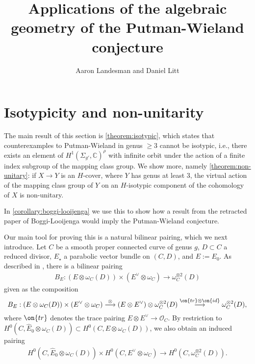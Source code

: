 \documentclass[12 pt]{amsart}
\title[Applications around the Putman-Wieland conjecture]{Applications of the algebraic geometry of the Putman-Wieland conjecture}
\author{Aaron Landesman and Daniel Litt}
\theoremstyle{plain}
\theoremstyle{definition}
\theoremstyle{remark}
\numberwithin{equation}{section}
\begin{document}
\section{Isotypicity and non-unitarity}\label{section:bilinear-pairing}
The main result of this section is \autoref{theorem:isotypic}, which states that
counterexamples to Putman-Wieland in genus $\geq 3$ cannot be isotypic, i.e.,
there exists an element of 
$H^1(\Sigma_{g'}, \mathbb C)^\rho$ with infinite orbit under the action of a finite
index subgroup of the mapping class group. We show more, namely \autoref{theorem:non-unitary}: if $X\to Y$ is an $H$-cover, where $Y$ has genus at least $3$, the virtual action of the mapping class group of $Y$ on an $H$-isotypic component of the cohomology of $X$ is non-unitary.

In \autoref{corollary:boggi-looijenga} we use this to show how a
 result from the retracted paper of Boggi-Looijenga \cite{boggiL:curves-with-prescribed-symmetry} would imply the Putman-Wieland conjecture.

Our main tool for proving this is a natural bilinear pairing, which we
next introduce.
Let $C$ be a smooth proper connected curve of genus $g$, $D\subset C$ a reduced
divisor, $E_\star$
a parabolic vector bundle on $(C,D)$, and $E := E_0$. 
As described in \cite[(4.5)]{landesmanL:canonical-representations}, there is a bilinear pairing
\begin{align}
	\label{equation:bilinear-pairing}
	B_E:
(E \otimes \omega_C(D))\times (E^\vee\otimes \omega_C) \to
\omega_C^{\otimes 2}(D)
\end{align}
given as the composition $$B_E: (E \otimes \omega_C(D))\times (E^\vee\otimes \omega_C)\overset{\otimes}{\longrightarrow} (E\otimes E^\vee)\otimes \omega_C^{\otimes 2}(D)\overset{\on{tr}\otimes \on{id}}{\longrightarrow} \omega_C^{\otimes 2}(D),$$
where $\on{tr}$ denotes the trace pairing ${E}\otimes {E}^\vee\to
\mathscr{O}_C.$ 
By restriction to $H^0(C, \widehat{E}_0 \otimes \omega_C(D)) \subset H^0(C, E \otimes
\omega_C(D))$, we also obtain an induced pairing
\begin{align*}
	H^0(C, \widehat{E}_0 \otimes \omega_C(D)) \times H^0(C, E^\vee \otimes
	\omega_C) \to H^0(C, \omega^{\otimes 2}_C(D)).
\end{align*}
\end{document}
